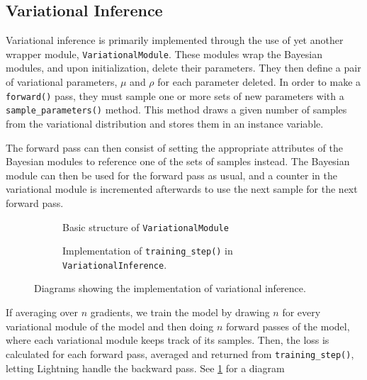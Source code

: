 \subsection{Variational Inference}
Variational inference is primarily implemented through the use of yet another wrapper module, \texttt{VariationalModule}.
These modules wrap the Bayesian modules, and upon initialization, delete their parameters.
They then define a pair of variational parameters, $\mu$ and $\rho$ for each parameter deleted. 
In order to make a \texttt{forward()} pass, they must sample one or more sets of new parameters with a \texttt{sample\_parameters()} method.
This method draws a given number of samples from the variational distribution and stores them in an instance variable.

The forward pass can then consist of setting the appropriate attributes of the Bayesian modules to reference one of the sets of samples instead. 
The Bayesian module can then be used for the forward pass as usual, and a counter in the variational module is incremented afterwards to use the next sample for the next forward pass.
\begin{figure}[htbp]
    \centering
    \begin{subfigure}[b]{0.48\linewidth}
        \centering
        \caption{Basic structure of \texttt{VariationalModule}}
        
    \end{subfigure}
    \begin{subfigure}[b]{0.48\linewidth}
        \centering
        \caption{Implementation of \texttt{training\_step()} in \texttt{VariationalInference}.}
        
    \end{subfigure}
    \caption{Diagrams showing the implementation of variational inference.}
    \label{fig:vi-arch}
\end{figure}
If averaging over $n$ gradients, we train the model by drawing $n$ for every variational module of the model and then doing $n$ forward passes of the model, where each variational module keeps track of its samples.
Then, the loss is calculated for each forward pass, averaged and returned from \texttt{training\_step()}, letting Lightning handle the backward pass. 
See \cref{fig:vi-arch} for a diagram 

